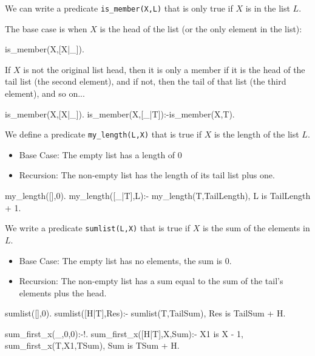 We can write a predicate \texttt{is\_member(X,L)} that is only true if $X$ is in the list $L$.

The base case is when $X$ is the head of the list (or the only element in the list):

\begin{codeblock}
is_member(X,[X|_]).
\end{codeblock}

If $X$ is not the original list head, then it is only a member if it is the head of the tail list (the second element), and if not, then the tail of that list (the third element), and so on...

\begin{codeblock}
is_member(X,[X|_]).
is_member(X,[_|T]):-is_member(X,T).
\end{codeblock}

We define a predicate \texttt{my\_length(L,X)} that is true if $X$ is the length of the list $L$. 
\begin{itemize}
    \item Base Case: The empty list has a length of $0$
    \item Recursion: The non-empty list has the length of its tail list plus one.
\end{itemize}

\begin{codeblock}
my_length([],0).
my_length([_|T],L):-
    my_length(T,TailLength),
    L is TailLength + 1.
\end{codeblock}

We write a predicate \texttt{sumlist(L,X)} that is true if $X$ is the sum of the elements in $L$.

\begin{itemize}
    \item Base Case: The empty list has no elements, the sum is $0$.
    \item Recursion: The non-empty list has a sum equal to the sum of the tail's elements plus the head.
\end{itemize}

\begin{codeblock}
sumlist([],0).
sumlist([H|T],Res):-
    sumlist(T,TailSum),
    Res is TailSum + H.
\end{codeblock}


\begin{codeblock}
sum_first_x(_,0,0):-!.
sum_first_x([H|T],X,Sum):-
    X1 is X - 1,
    sum_first_x(T,X1,TSum),
    Sum is TSum + H.
\end{codeblock}

